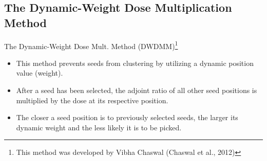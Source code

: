 \documentclass{beamer}
\begin{document}
\subsection{The Dynamic-Weight Dose Multiplication Method}
\begin{frame}{The Dynamic-Weight Dose Mult. Method (DWDMM)\footnote{This method was developed by Vibha Chaswal (Chaswal et al., 2012)}}

  \begin{itemize}
      \item This method prevents seeds from clustering by utilizing a dynamic
        position value (weight). 
        \medskip
      \item After a seed has been selected, the adjoint ratio of all other
        seed positions is multiplied by the dose at its respective position. 
        \medskip
      \item The closer a seed position is to previously selected seeds, the
        larger its dynamic weight and the less likely it is to be picked.
    \end{itemize}

\end{frame}

\end{document}
